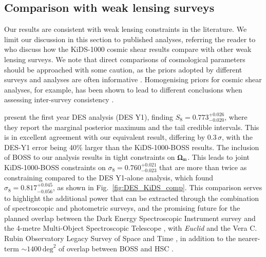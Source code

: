 \subsection{Comparison with weak lensing surveys}
\label{sec:WL_comp}
Our results are consistent with weak lensing constraints in the literature.   We limit our discussion in this section to published \tttp analyses, referring the reader to \citet{asgari/etal:inprep} who discuss how the KiDS-1000 cosmic shear results compare with other weak lensing surveys.   We note that direct comparisons of cosmological parameters should be approached with some caution, as the priors adopted by different surveys and analyses are often informative \citep[see section 6.1 in][]{joachimi/etal:inprep}.   Homogenising priors for cosmic shear analyses, for example, has been shown to lead to different conclusions when assessing inter-survey consistency \citep{chang/etal:2019, joudaki/etal:2020, asgari/etal:2020_KD}.   

\citet{abbott/etal:2018} present the first year \tttp DES analysis (DES Y1), finding $S_8=0.773^{+0.026}_{-0.020}$, where they report the marginal posterior maximum and the tail credible intervals.  
This is in excellent agreement with our equivalent result, differing by $0.3\,\sigma$, with the DES-Y1 error being 40\% larger than the KiDS-1000-BOSS \tttp results.  The inclusion of BOSS to our \tttp analysis results in tight constraints on $\Omega_{\rm m}$.  
This leads to joint KiDS-1000-BOSS constraints on $\sigma_8=0.760^{+0.021}_{-0.023}$ that are more than twice as constraining compared to the DES Y1-alone \tttp analysis, which found $\sigma_8=0.817^{+0.045}_{-0.056}$, as shown in Fig.~\ref{fig:DES_KiDS_comp}. 
This comparison serves to highlight the additional power that can be extracted through the combination of spectroscopic and photometric surveys,  and the promising future for the planned overlap between the Dark Energy Spectroscopic Instrument survey \citep{DESI/etal:2016} and the 4-metre Multi-Object Spectroscopic Telescope \citep[4MOST,][]{richard/etal:2019},
with {\it Euclid} and the Vera C. Rubin Observatory Legacy Survey of Space and Time \citep{laureijs/etal:2011,lsst/etal:2009}, in addition to the nearer-term $\sim\!1400\,\mathrm{deg}^{2}$ of overlap between BOSS and HSC \citep{aihara/etal:2019}. 


